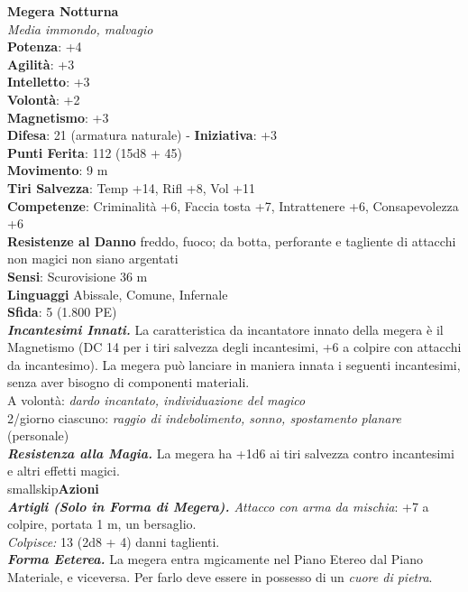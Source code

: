 \begin{multicols}{2}
\medskip\textbf{Megera Notturna}\\
\emph{Media immondo, malvagio}\\
\textbf{Potenza}: +4\\
\textbf{Agilità}: +3\\
\textbf{Intelletto}: +3\\
\textbf{Volontà}: +2\\
\textbf{Magnetismo}: +3\\
\textbf{Difesa}: 21 (armatura naturale) - \textbf{Iniziativa}: +3\\
\textbf{Punti Ferita}: 112 (15d8 + 45)\\
\textbf{Movimento}: 9 m\\
\textbf{Tiri Salvezza}: Temp +14, Rifl +8, Vol +11\\
\textbf{Competenze}: Criminalità +6, Faccia tosta +7, Intrattenere +6, Consapevolezza +6\\
\textbf{Resistenze al Danno} freddo, fuoco; da botta, perforante e tagliente di attacchi non magici non siano argentati\\
\textbf{Sensi}: Scurovisione 36 m\\
\textbf{Linguaggi} Abissale, Comune, Infernale\\
\textbf{Sfida}: 5 (1.800 PE)\smallskip\\

\emph{\textbf{Incantesimi Innati.}} La caratteristica da incantatore innato della megera è il Magnetismo (DC 14 per i tiri salvezza degli incantesimi, +6 a colpire con attacchi da incantesimo). La megera può lanciare in maniera innata i seguenti incantesimi, senza aver bisogno di componenti materiali.\\

A volontà: \emph{dardo incantato, individuazione del magico}\\
2/giorno ciascuno: \emph{raggio di indebolimento, sonno, spostamento} \emph{planare} (personale)\\
\emph{\textbf{Resistenza alla Magia.}} La megera ha +1d6 ai tiri salvezza contro incantesimi e altri effetti magici.\\
smallskip\textbf{Azioni}\\
\emph{\textbf{Artigli (Solo in Forma di Megera).} Attacco con arma da mischia}: +7 a colpire, portata 1 m, un bersaglio.\\
\emph{Colpisce:} 13 (2d8 + 4) danni taglienti.\\

\emph{\textbf{Forma Eeterea.}} La megera entra mgicamente nel Piano Etereo dal Piano Materiale, e viceversa. Per farlo deve essere in possesso di un \emph{cuore di pietra}.\\


\end{multicols}
